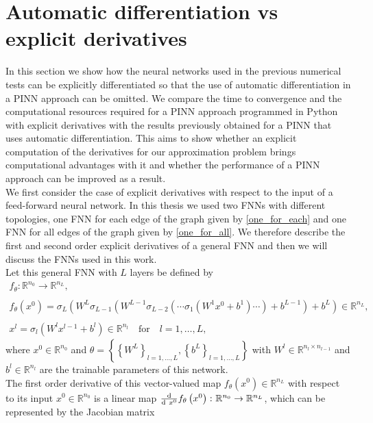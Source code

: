 \section{Automatic differentiation vs explicit derivatives}
\label{ch3:sec3}

In this section we show how the neural networks used in the previous numerical tests can be explicitly differentiated so that the use of automatic differentiation in a PINN approach can be omitted. We compare the time to convergence and the computational resources required for a PINN approach programmed in Python with explicit derivatives with the results previously obtained for a PINN that uses automatic differentiation. This aims to show whether an explicit computation of the derivatives for our approximation problem brings computational advantages with it and whether the performance of a PINN approach can be improved as a result. \\
We first consider the case of explicit derivatives with respect to the input of a feed-forward neural network. In this thesis we used two FNNs with different topologies, one FNN for each edge of the graph given by \cref{one_for_each} and one FNN for all edges of the graph given by \cref{one_for_all}. We therefore describe the first and second order explicit derivatives of a general FNN and then we will discuss the FNNs used in this work. \\
Let this general FNN with $L$ layers be defined by 
\begin{gather}
    \label{model prediction}
    f_{\theta} \colon \mathbb{R}^{n_0} \to \mathbb{R}^{n_L}, \\
    \\
    f_{\theta}\left(x^0\right) = \sigma_L\left(W^L \sigma_{L-1}\left(W^{L-1}\sigma_{L-2}\left(\cdots \sigma_{1}\left(W^{1}x^0 + b^1\right) \cdots\right) + b^{L-1}\right) + b^{L}\right) \in \mathbb{R}^{n_L}, \\
    \\
    x^l = \sigma_l\left(W^l x^{l-1} + b^l\right) \in \mathbb{R}^{n_l} \quad \text{for} \quad l = 1, \ldots, L,
\end{gather}
where $x^0 \in \mathbb{R}^{n_0}$ and $\theta = \left\{ \left\{ W^L \right\}_{l = 1, \ldots, L}, \left\{ b^L \right\}_{l = 1, \ldots, L} \right\}$ with $W^l \in \mathbb{R}^{n_l \times n_{l-1}}$ and $b^l \in \mathbb{R}^{n_l}$ are the trainable parameters of this network. \\
The first order derivative of this vector-valued map $f_{\theta}\left(x^0\right) \in \mathbb{R}^{n_L}$ with respect to its input $x^0 \in \mathbb{R}^{n_0}$ is a linear map $\frac{\textup{d}}{\textup{d} \ x^0} f_{\theta}\left(x^0\right) \colon \mathbb{R}^{n_0} \to \mathbb{R}^{n_L}$, which can be represented by the Jacobian matrix
